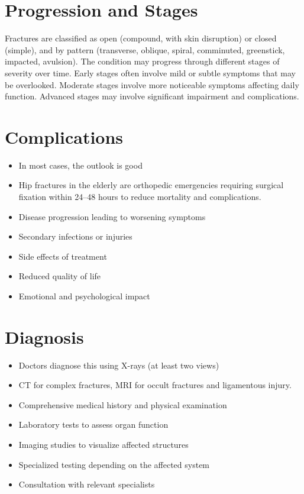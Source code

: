 \section{Progression and Stages}
Fractures are classified as open (compound, with skin disruption) or closed (simple), and by pattern (transverse, oblique, spiral, comminuted, greenstick, impacted, avulsion). The condition may progress through different stages of severity over time. Early stages often involve mild or subtle symptoms that may be overlooked. Moderate stages involve more noticeable symptoms affecting daily function. Advanced stages may involve significant impairment and complications.
\section{Complications}
\begin{itemize}[noitemsep]
  \item In most cases, the outlook is good
  \item Hip fractures in the elderly are orthopedic emergencies requiring surgical fixation within 24--48 hours to reduce mortality and complications.
  \item Disease progression leading to worsening symptoms
  \item Secondary infections or injuries
  \item Side effects of treatment
  \item Reduced quality of life
  \item Emotional and psychological impact
\end{itemize}
\section{Diagnosis}
\begin{itemize}[noitemsep]
  \item Doctors diagnose this using X-rays (at least two views)
  \item CT for complex fractures, MRI for occult fractures and ligamentous injury.
  \item Comprehensive medical history and physical examination
  \item Laboratory tests to assess organ function
  \item Imaging studies to visualize affected structures
  \item Specialized testing depending on the affected system
  \item Consultation with relevant specialists
\end{itemize}
